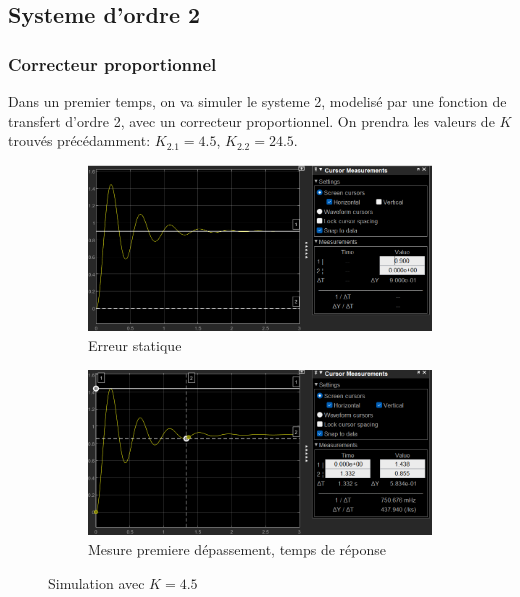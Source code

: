 \documentclass[12pt, a4paper]{report}
\begin{document}
\subsection{Systeme d'ordre 2}

\subsubsection{Correcteur proportionnel}

Dans un premier temps, on va simuler le systeme 2, modelisé par une fonction de transfert d'ordre 2, avec un correcteur
proportionnel. On prendra les valeurs de $K$ trouvés précédamment: $K_{2.1} = 4.5$, $K_{2.2} = 24.5$.

\begin{figure}[H]
    \begin{subfigure}[h!]{0.4\linewidth}
        \includegraphics[width=\linewidth]{sim2kpourerreur10prc.png}
        \caption{Erreur statique}
    \end{subfigure}
    \hfill    
    \begin{subfigure}[h!]{0.4\linewidth}
        \includegraphics[width=\linewidth]{sim2kpourerreur10prcdeptr.png}
        \caption{Mesure premiere dépassement, temps de réponse}
    \end{subfigure}
    \caption{Simulation avec $K = 4.5$}
    \label{fig:sim2Kpour10prc}
\end{figure}
\end{document}
